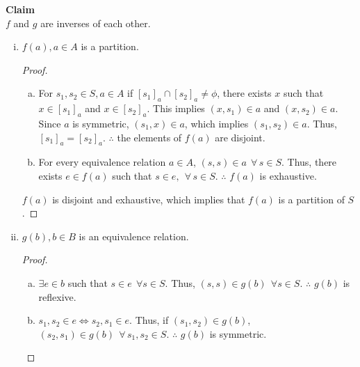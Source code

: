 \documentclass[12pt]{article}
\begin{document}
      {\bf Claim}\\
$f$ and $g$ are inverses of each other.
\begin{enumerate}[(i)]
      \item $f(a), a\in A$ is a partition.
            \begin{proof}

                  \begin{enumerate}[(a)]
                        \item For $s_1, s_2 \in S, a \in A$ if $[s_1]_a \cap [s_2]_a \ne \phi$, there exists $x$ such that
                              $x \in [s_1]_a$ and $x \in [s_2]_a$. This implies $(x, s_1) \in a$ and $(x, s_2) \in a$. Since $a$
                              is symmetric, $(s_1, x) \in a$, which
                              implies $(s_1, s_2) \in a$. Thus, $[s_1]_a = [s_2]_a$. $\therefore$ the elements
                              of $f(a)$ are disjoint.

                        \item For every equivalence relation $a \in A$, $(s, s) \in a \ \ \forall\, s \in S$. Thus,
                              there exists $e \in f(a)$ such that $s \in e, \ \ \forall\, s \in S$. $\therefore$
                              $f(a)$ is exhaustive.
                  \end{enumerate}

                  $f(a)$ is disjoint and exhaustive, which implies that $f(a)$ is a partition of $S$.
            \end{proof}
      \item $g(b), b\in B$ is an equivalence relation.
            \begin{proof}

                  \begin{enumerate}[(a)]
                        \item $\exists e \in b$ such that $s\in e \ \ \forall s \in S$. Thus, $(s, s) \in g(b) \ \ \forall s \in S$.
                              $\therefore$ $g(b)$ is reflexive.

                        \item $s_1, s_2 \in e \Longleftrightarrow s_2, s_1 \in e$. Thus,
                              if $(s_1, s_2) \in g(b)$, $(s_2, s_1) \in g(b) \ \ \forall \, s_1, s_2 \in S$.
                              $\therefore$ $g(b)$ is symmetric.


\end{enumerate}
\end{proof}
\end{enumerate}
\end{document}
